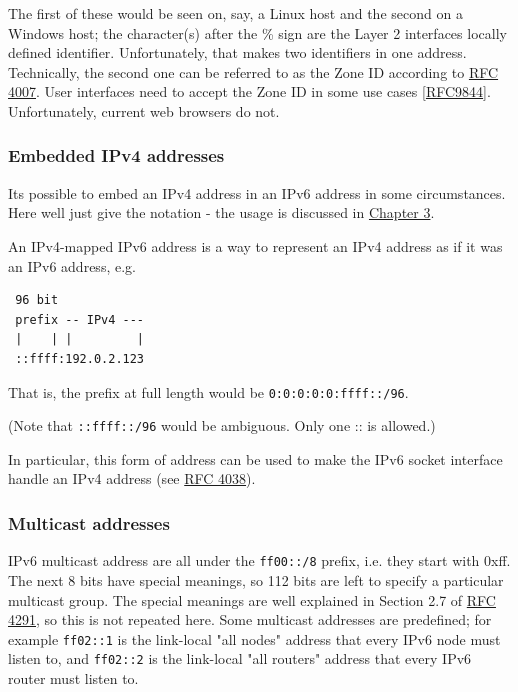 \documentclass[
]{article}
\begin{document}
The first of these would be seen on, say, a Linux host and the second on
a Windows host; the character(s) after the
\textquotesingle\%\textquotesingle{} sign are the Layer 2
interface\textquotesingle s locally defined identifier. Unfortunately,
that makes two \textquotesingle identifiers\textquotesingle{} in one
address. Technically, the second one can be referred to as the
\textquotesingle Zone ID\textquotesingle{} according to
\href{https://www.rfc-editor.org/info/rfc4007}{RFC 4007}. User
interfaces need to accept the Zone ID in some use cases
{[}\href{https://www.rfc-editor.org/info/rfc9844}{RFC9844}{]}.
Unfortunately, current web browsers do not.

\subsubsection{Embedded IPv4 addresses}\label{embedded-ipv4-addresses}

It\textquotesingle s possible to embed an IPv4 address in an IPv6
address in some circumstances. Here we\textquotesingle ll just give the
notation - the usage is discussed in
\href{https://github.com/becarpenter/book6/tree/main/3.\%20Coexistence\%20with\%20legacy\%20IPv4}{Chapter
3}.

An IPv4-mapped IPv6 address is a way to represent an IPv4 address as if
it was an IPv6 address, e.g.

\begin{verbatim}
 96 bit
 prefix -- IPv4 ---
 |    | |         |
 ::ffff:192.0.2.123
\end{verbatim}

That is, the prefix at full length would be
\texttt{0:0:0:0:0:ffff::/96}.

(Note that \texttt{::ffff::/96} would be ambiguous. Only one
\textquotesingle::\textquotesingle{} is allowed.)

In particular, this form of address can be used to make the IPv6 socket
interface handle an IPv4 address (see
\href{https://www.rfc-editor.org/info/rfc4038}{RFC 4038}).

\subsubsection{Multicast addresses}\label{multicast-addresses}

IPv6 multicast address are all under the \texttt{ff00::/8} prefix, i.e.
they start with 0xff. The next 8 bits have special meanings, so 112 bits
are left to specify a particular multicast group. The special meanings
are well explained in Section 2.7 of
\href{http://www.rfc-editor.org/info/rfc4291}{RFC 4291}, so this is not
repeated here. Some multicast addresses are predefined; for example
\texttt{ff02::1} is the link-local "all nodes" address that every IPv6
node must listen to, and \texttt{ff02::2} is the link-local "all
routers" address that every IPv6 router must listen to.
\end{document}

